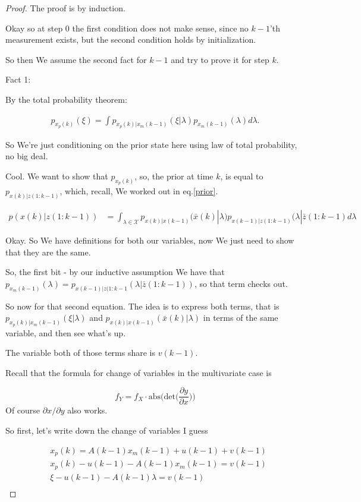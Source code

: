 \documentclass{article}
\begin{document}
		\begin{proof}
			The proof is by induction.
			
			Okay so at step 0 the first condition does not make sense, since no $k-1$'th measurement exists, but the second condition holds by initialization.
			
			So then We assume the second fact for $k-1$ and try to prove it for step $k$.
			
			Fact 1:
			
			By the total probability theorem:
			
			\begin{align}
				p_{x_p(k)}(\xi) = \int p_{x_p(k)|x_m(k-1)}(\xi|\lambda)p_{x_m(k-1)}(\lambda) d\lambda.
			\end{align}
			
			So We're just conditioning on the prior state here using law of total probability, no big deal.
			
			Cool. We want to show that $p_{x_p(k)}$, so, the prior at time $k$, is equal to $p_{x(k)|z(1:k-1)}$, which, recall, We worked out in eq.\ref{prior}.
			
			\begin{align}
			p(x(k)|z(1:k-1)) &= \int_{\lambda\in\mathcal{X}} p_{x(k)|x(k-1)}(\bar{x}(k)|\lambda) p_{x(k-1)|z(1:k-1)}(\lambda|\bar{z}(1:k-1) d\lambda
		\end{align}
			
			Okay. So We have definitions for both our variables, now We just need to show that they are the same.
			
			So, the first bit - by our inductive assumption We have that $p_{x_m(k-1)}(\lambda) = p_{x(k-1)|z(1:k-1}(\lambda|\bar{z}(1:k-1))$, so that term checks out.
			
			So now for that second equation. The idea is to express both terms, that is $p_{x_p(k)|x_m(k-1)}(\xi|\lambda)$ and $p_{x(k)|x(k-1)}(\bar{x}(k)|\lambda)$ in terms of the same variable, and then see what's up. 
			
			The variable both of those terms share is $v(k-1)$. 
			
			Recall that the formula for change of variables in the multivariate case is
			
			\[ f_Y = f_X \cdot \text{abs}\bigg(\text{det}\bigg(\frac{\partial y}{\partial x} \bigg)\bigg)\]			
			Of course $\partial x/\partial y$ also works. 
			
			So first, let's write down the change of variables I guess
			
			\begin{align}
				&x_p(k) = A(k-1)x_m(k-1) + u(k-1) + v(k-1)\\
				&x_p(k) - u(k-1) - A(k-1)x_m(k-1) =  v(k-1)\\
				&\xi - u(k-1) - A(k-1)\lambda =  v(k-1)\\
			\end{align} 
			

\end{proof}
\end{document}
